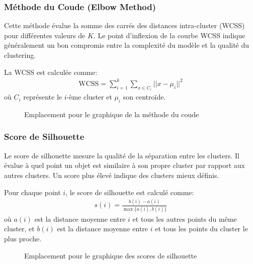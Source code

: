 \documentclass[12pt]{article}
\begin{document}
\subsubsection{Méthode du Coude (Elbow Method)}
Cette méthode évalue la somme des carrés des distances intra-cluster (WCSS) pour différentes valeurs de $K$. Le point d'inflexion de la courbe WCSS indique généralement un bon compromis entre la complexité du modèle et la qualité du clustering.

La WCSS est calculée comme:
\begin{align}
\text{WCSS} = \sum_{i=1}^{k}\sum_{x \in C_i} ||x - \mu_i||^2
\end{align}
où $C_i$ représente le $i$-ème cluster et $\mu_i$ son centroïde.

\begin{figure}[H]
    \centering
    \caption{Emplacement pour le graphique de la méthode du coude}
    \label{fig:elbow}
\end{figure}

\subsubsection{Score de Silhouette}
Le score de silhouette mesure la qualité de la séparation entre les clusters. Il évalue à quel point un objet est similaire à son propre cluster par rapport aux autres clusters. Un score plus élevé indique des clusters mieux définis.

Pour chaque point $i$, le score de silhouette est calculé comme:
\begin{align}
s(i) = \frac{b(i) - a(i)}{\max\{a(i), b(i)\}}
\end{align}
où $a(i)$ est la distance moyenne entre $i$ et tous les autres points du même cluster, et $b(i)$ est la distance moyenne entre $i$ et tous les points du cluster le plus proche.

\begin{figure}[H]
    \centering
    \caption{Emplacement pour le graphique des scores de silhouette}
    \label{fig:silhouette}
\end{figure}
\end{document}
